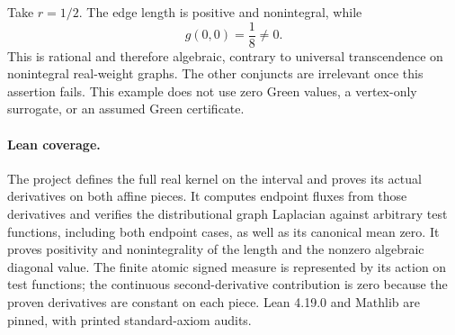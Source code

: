 \documentclass[11pt]{article}
\begin{document}
Take $r=1/2$. The edge length is positive and nonintegral, while
\[
 g(0,0)=\frac18\ne0.
\]
This is rational and therefore algebraic, contrary to universal
transcendence on nonintegral real-weight graphs. The other conjuncts
are irrelevant once this assertion fails. This example does not use
zero Green values, a vertex-only surrogate, or an assumed Green
certificate.

\paragraph{Lean coverage.}
The project defines the full real kernel on the interval and proves
its actual derivatives on both affine pieces. It computes endpoint
fluxes from those derivatives and verifies the distributional graph
Laplacian against arbitrary test functions, including both endpoint
cases, as well as its canonical mean zero. It proves positivity and
nonintegrality of the length and the nonzero algebraic diagonal value.
The finite atomic signed measure is represented by its action on test
functions; the continuous second-derivative contribution is zero
because the proven derivatives are constant on each piece.
Lean 4.19.0 and Mathlib are pinned, with printed standard-axiom audits.
\end{document}
